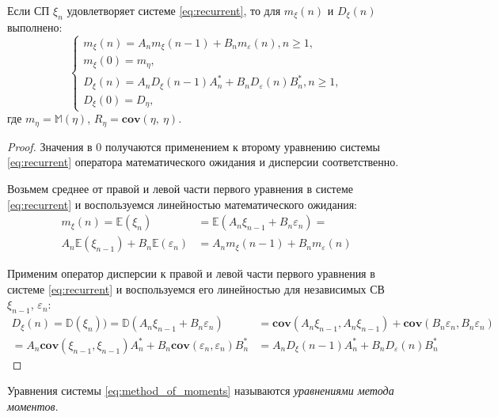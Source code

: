 \begin{theorem} 
	Если СП $\xi_n$  удовлетворяет системе \eqref{eq:recurrent}, то для $m_\xi(n)$ и $D_\xi(n)$ выполнено:
	\begin{equation}
	    \label{eq:method_of_moments}
	    \begin{cases}
	        m_\xi(n) = A_n m_\xi(n-1) + B_n m_\varepsilon(n), n \geq 1,\\
	        m_\xi(0) = m_\eta,\\
	        D_\xi(n) = A_n D_\xi(n-1) A_n^* + B_n D_\varepsilon(n) B_n^*, n \geq 1,\\
	        D_\xi(0) = D_\eta,
	    \end{cases}
	\end{equation}
	где $m_{\eta} = \mathbb{M}(\eta)$, $R_{\eta} = \mathbf{cov}(\eta,~\eta)$.
\end{theorem}

\begin{proof} 
	Значения в 0 получаются применением к второму уравнению системы \eqref{eq:recurrent} оператора математического ожидания и дисперсии соответственно.
	
	Возьмем среднее от правой и левой части первого уравнения в системе \eqref{eq:recurrent} и воспользуемся линейностью математического ожидания:
	\begin{align*}
	    m_\xi(n) = \mathbb{E}(\xi_n) &=  \mathbb{E}(A_n \xi_{n-1} + B_n \varepsilon_n) = \\ A_n\mathbb{E}(\xi_{n-1}) + B_n\mathbb{E}(\varepsilon_n) &= A_n m_\xi(n-1) + B_n m_\varepsilon(n)
	\end{align*}
	
	Применим оператор дисперсии к правой и левой части первого уравнения в системе \eqref{eq:recurrent} и воспользуемся его линейностью для независимых СВ $\xi_{n-1}$, $\varepsilon_n$:
	\begin{align*}
	    D_\xi(n) = \mathbb{D}(\xi_n)) =  \mathbb{D}(A_n \xi_{n-1} + B_n \varepsilon_n) &= \mathbf{cov}(A_n\xi_{n-1}, A_n\xi_{n-1}) + \mathbf{cov}(B_n\varepsilon_{n}, B_n\varepsilon_{n}) \\ = A_n \mathbf{cov}(\xi_{n-1}, \xi_{n-1}) A_n^* + B_n \mathbf{cov}(\varepsilon_{n}, \varepsilon_{n}) B_n^* &= A_n D_\xi(n-1) A_n^* + B_n D_\varepsilon(n) B_n^*
	\end{align*}
\end{proof}

\begin{definition} 
	Уравнения системы \eqref{eq:method_of_moments} называются \textit{уравнениями метода моментов}.
\end{definition}
\vspace{1mm}

